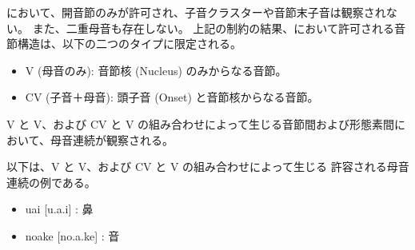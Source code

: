 \langname において、開音節のみが許可され、子音クラスターや音節末子音は観察されない。
また、二重母音も存在しない。
上記の制約の結果、\langname において許可される音節構造は、以下の二つのタイプに限定される。

\begin{itemize}
    \item {V (母音のみ)}: 音節核 (Nucleus) のみからなる音節。
    \item {CV (子音＋母音)}: 頭子音 (Onset) と音節核からなる音節。
\end{itemize}

{V} と {V}、および {CV} と {V} の組み合わせによって生じる音節間および形態素間において、母音連続が観察される。

以下は、{V} と {V}、および {CV} と {V} の組み合わせによって生じる
許容される母音連続の例である。

\begin{itemize}
    \item uai [u.a.i] : 鼻
    \item noake [no.a.ke] : 音
\end{itemize}
